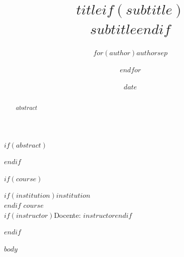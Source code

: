 \documentclass[12pt]{article}
\title{$title$$if(subtitle)$\\\large $subtitle$$endif$}
\author{$for(author)$$author$$sep$ \and $endfor$}
\date{$date$}
\begin{document}
\maketitle

$if(abstract)$
\begin{abstract}
$abstract$
\end{abstract}
$endif$

$if(course)$
\begin{center}
$if(institution)$$institution$\\$endif$
$course$\\
$if(instructor)$Docente: $instructor$$endif$
\end{center}
$endif$

\tableofcontents

\thispagestyle{empty}
\newpage
{}

$body$
\end{document}
